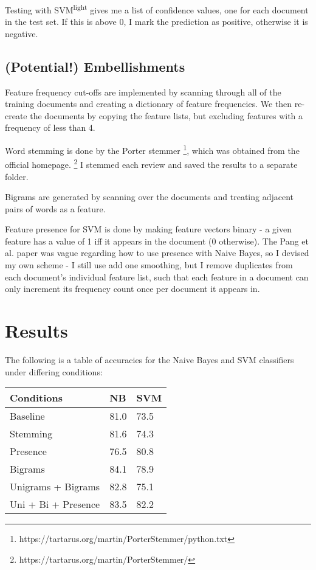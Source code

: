 \documentclass[12pt,a4paper,twoside]{article}
\begin{document}
Testing with SVM\textsuperscript{light} gives me a list of confidence values, one for each document in the test set. If this is above 0, I mark the prediction as positive, otherwise it is negative.

\subsection{(Potential!) Embellishments}

Feature frequency cut-offs are implemented by scanning through all of the training documents and creating a dictionary of feature frequencies. We then re-create the documents by copying the feature lists, but excluding features with a frequency of less than 4.

Word stemming is done by the Porter stemmer \footnote{https://tartarus.org/martin/PorterStemmer/python.txt}, which was obtained from the official homepage. \footnote{https://tartarus.org/martin/PorterStemmer/} I stemmed each review and saved the results to a separate folder.

Bigrams are generated by scanning over the documents and treating adjacent pairs of words as a feature.

Feature presence for SVM is done by making feature vectors binary - a given feature has a value of 1 iff it appears in the document (0 otherwise). The Pang et al. paper was vague regarding how to use presence with Naive Bayes, so I devised my own scheme - I still use add one smoothing, but I remove duplicates from each document's individual feature list, such that each feature in a document can only increment its frequency count once per document it appears in.


\section{Results}

The following is a table of accuracies for the Naive Bayes and SVM classifiers under differing conditions:

\begin{center}
\begin{tabular}{|l|l|l|}
\hline
\textbf{Conditions} & \textbf{NB} & \textbf{SVM} \\ \hline
Baseline & 81.0 & 73.5 \\ \hline
Stemming & 81.6 & 74.3 \\ \hline
Presence & 76.5 & 80.8 \\ \hline
Bigrams & 84.1 & 78.9 \\ \hline
Unigrams + Bigrams & 82.8 & 75.1 \\ \hline
Uni + Bi + Presence & 83.5 & 82.2 \\ \hline
\end{tabular}
\end{center}
\end{document}
